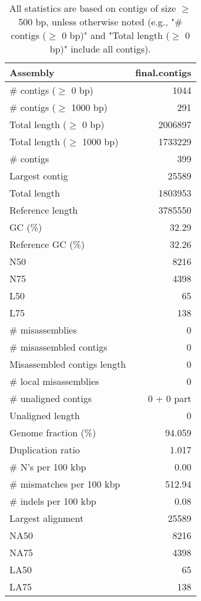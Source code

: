 \documentclass[12pt,a4paper]{article}
\begin{document}
\begin{table}[ht]
\begin{center}
\caption{All statistics are based on contigs of size $\geq$ 500 bp, unless otherwise noted (e.g., "\# contigs ($\geq$ 0 bp)" and "Total length ($\geq$ 0 bp)" include all contigs).}
\begin{tabular}{|l*{1}{|r}|}
\hline
Assembly & final.contigs \\ \hline
\# contigs ($\geq$ 0 bp) & 1044 \\ \hline
\# contigs ($\geq$ 1000 bp) & 291 \\ \hline
Total length ($\geq$ 0 bp) & 2006897 \\ \hline
Total length ($\geq$ 1000 bp) & 1733229 \\ \hline
\# contigs & 399 \\ \hline
Largest contig & 25589 \\ \hline
Total length & 1803953 \\ \hline
Reference length & 3785550 \\ \hline
GC (\%) & 32.29 \\ \hline
Reference GC (\%) & 32.26 \\ \hline
N50 & 8216 \\ \hline
N75 & 4398 \\ \hline
L50 & 65 \\ \hline
L75 & 138 \\ \hline
\# misassemblies & 0 \\ \hline
\# misassembled contigs & 0 \\ \hline
Misassembled contigs length & 0 \\ \hline
\# local misassemblies & 0 \\ \hline
\# unaligned contigs & 0 + 0 part \\ \hline
Unaligned length & 0 \\ \hline
Genome fraction (\%) & 94.059 \\ \hline
Duplication ratio & 1.017 \\ \hline
\# N's per 100 kbp & 0.00 \\ \hline
\# mismatches per 100 kbp & 512.94 \\ \hline
\# indels per 100 kbp & 0.08 \\ \hline
Largest alignment & 25589 \\ \hline
NA50 & 8216 \\ \hline
NA75 & 4398 \\ \hline
LA50 & 65 \\ \hline
LA75 & 138 \\ \hline
\end{tabular}
\end{center}
\end{table}
\end{document}
